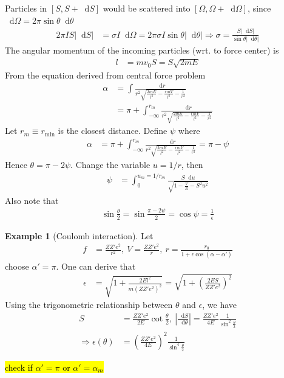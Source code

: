 \documentclass[twoside,9pt]{article}
\numberwithin{equation}{section} %
\newcommand{\lms}{\fontfamily{lmss}\selectfont} %
\renewcommand*\d{\mathop{}\!\mathrm{d}}
\theoremstyle{definition}
\newtheorem{example}{\lms Example}[section]
\theoremstyle{remark}
\begin{document}
Particles in $[S,S+\d S]$ would be scattered into
$[\Omega, \Omega+\d\Omega]$, since $\d\Omega=2\pi\sin\theta\d\theta$
\begin{align}
    2\pi IS|\d S| &= \sigma I\d\Omega
    = 2\pi\sigma I\sin\theta|\d\theta|
    \Rightarrow
    \sigma = \frac{S|\d S|}{\sin\theta|\d\theta|}
\end{align}
The angular momentum of the incoming particles (wrt. to force center)
is
\begin{align}
    l &= mv_0 S = S\sqrt{2mE}
\end{align}
From the equation derived from central force problem
\begin{align}
    \alpha &= \int
    \frac{\d r}{r^2\sqrt{\frac{2mE}{l^2} - \frac{rmV}{l^2}-\frac{1}{r^2}}}
    \\
    &= \pi + \int_{-\infty}^{r_m}
    \frac{\d r}{r^2\sqrt{\frac{2mE}{l^2} - \frac{rmV}{l^2}-\frac{1}{r^2}}}
\end{align}
Let $r_m\equiv r_{\min}$ is the closest distance.
Define $\psi$ where
\begin{align}
    \alpha &= 
    \pi + \int_{-\infty}^{r_m}
    \frac{\d r}{r^2\sqrt{\frac{2mE}{l^2} - \frac{rmV}{l^2}-\frac{1}{r^2}}}
    = \pi - \psi
\end{align}
Hence $\theta=\pi-2\psi$.
Change the variable $u=1/r$, then
\begin{align}
    \psi &= 
    \int_0^{u_m=1/r_m}\frac{S\d u}{\sqrt{
        1 - \frac{V}{E} - S^2 u^2
    }}
\end{align}
Also note that
\begin{align}
    \sin\frac{\theta}{2} = \sin\frac{\pi-2\psi}{2} = \cos\psi = \frac{1}{\epsilon}
\end{align}
\begin{example}[Coulomb interaction]
Let 
\begin{align}
    f &= \frac{ZZ'e^2}{r^2},~
    V = \frac{ZZ'e^2}{r},~
    r = \frac{r_0}{1 + \epsilon\cos(\alpha-\alpha')}
\end{align}
choose $\alpha'=\pi$.
One can derive that
\begin{align}
    \epsilon &=
    \sqrt{1 + 
    \frac{2El^2}{m(ZZ'e^2)^2}}
    = \sqrt{ 1 + \left(
        \frac{2ES}{ZZ'e^2}
    \right)^2}
\end{align}
Using the trigonometric relationship between $\theta$ and $\epsilon$,
we have
\begin{align}
    S &= \frac{ZZ'e^2}{2E}\cot\frac{\theta}{2},~
    \left|\frac{\d S}{\d\theta}\right| = 
    \frac{ZZ'e^2}{4E}\frac{1}{\sin^2\frac{\theta}{2}}\\
    \Rightarrow
    \epsilon(\theta) &= 
    \left(\frac{ZZ'e^2}{4E}\right)^2 \frac{1}{\sin^4\frac{\theta}{2}}
\end{align}

\hl{check if $\alpha'=\pi$ or $\alpha'=\alpha_m$}
\end{example}
\end{document}
